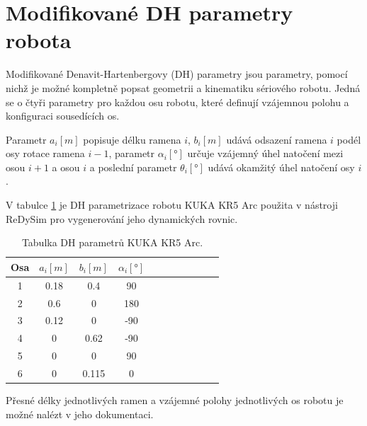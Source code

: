 \section{Modifikované DH parametry robota}

Modifikované Denavit-Hartenbergovy (DH) parametry jsou parametry, pomocí nichž je možné kompletně popsat geometrii a kinematiku sériového robotu. Jedná se o čtyři parametry pro každou osu robotu, které definují vzájemnou polohu a konfiguraci sousedících os. 

Parametr $a_i [m]$ popisuje délku ramena $i$, $b_i [m]$ udává odsazení ramena $i$ podél osy rotace ramena $i-1$, parametr $\alpha_i [\si{\degree}]$ určuje vzájemný úhel natočení mezi osou $i+1$ a osou $i$ a poslední parametr $\theta_i [\si{\degree}]$ udává okamžitý úhel natočení osy $i$.

V tabulce \ref{tab_DH_kuka} je DH parametrizace robotu KUKA KR5 Arc použita v nástroji ReDySim pro vygenerování jeho dynamických rovnic.

\begin{table}[htbp]
  \centering
  \caption{Tabulka DH parametrů KUKA KR5 Arc.}
    \begin{tabular}{c|cccccccccc}
    \multicolumn{1}{c|}{Osa} & \multicolumn{1}{c}{$a_{i} [m]$} & \multicolumn{1}{c}{$b_{i} [m]$} & \multicolumn{1}{c}{$\alpha_{i} [\si{\degree}]$} \\
    \hline
    1     &   0.18  &  0.4   &  90     &     \\
    2     &   0.6   &  0     &  180    &     \\
    3     &   0.12  &  0     &  -90    &     \\
    4     &   0     &  0.62  &  -90    &     \\
    5     &   0     &  0     &  90     &     \\
    6     &   0     &  0.115 &  0      &     \\
    \end{tabular}%
  \label{tab_DH_kuka}%
\end{table}%

Přesné délky jednotlivých ramen a vzájemné polohy jednotlivých os robotu je možné nalézt v jeho dokumentaci.

